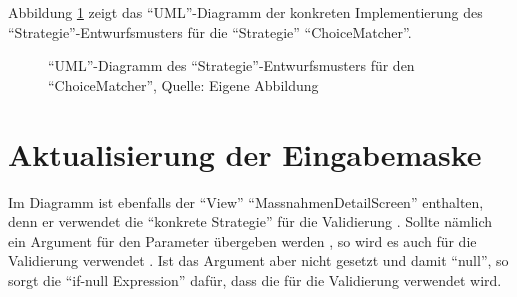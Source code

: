 Abbildung \ref{fig:UmlChoiceMatcherStrategyPattern} zeigt das \enquote{UML}-Diagramm der konkreten Implementierung des \enquote{Strategie}-Entwurfsmusters für die \enquote{Strategie} \enquote{ChoiceMatcher}.

\ifIncludeFigures
  \begin{figure}[h]
    \centering


    \caption[\enquote{UML}-Diagramm des \enquote{Strategie}-Entwurfsmusters für den \enquote{ChoiceMatcher}]{\enquote{UML}-Diagramm des \enquote{Strategie}-Entwurfsmusters für den \enquote{ChoiceMatcher}, Quelle: Eigene Abbildung}
    \label{fig:UmlChoiceMatcherStrategyPattern}

  \end{figure}%
\fi

\section{Aktualisierung der Eingabemaske}

Im Diagramm ist ebenfalls der \enquote{View} \enquote{MassnahmenDetailScreen} enthalten,
denn er verwendet die \enquote{konkrete Strategie}  für die Validierung \Lst{\ref{lst:Schritt7buildSelectionCard}}.
Sollte nämlich ein Argument für den Parameter  übergeben werden ,
so wird es auch für die Validierung verwendet .
Ist das Argument aber nicht gesetzt und damit \enquote{null},
so sorgt die \enquote{if-null Expression} dafür,
dass die  für die Validierung verwendet wird.

